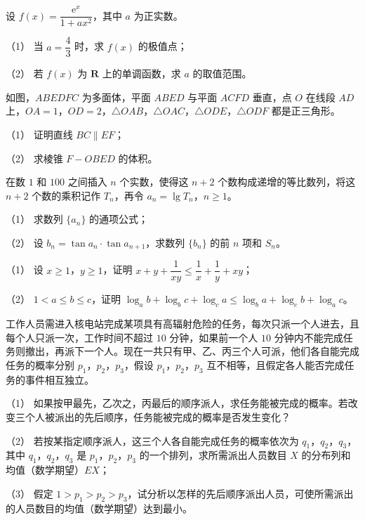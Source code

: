 \begin{question}
设 $f(x)=\dfrac{\mathrm e^x}{1+ax^2}$，其中 $a$ 为正实数。

（1） 当 $a=\dfrac43$ 时，求 $f(x)$ 的极值点；

（2） 若 $f(x)$ 为 $\mathbf R$ 上的单调函数，求 $a$ 的取值范围。

\Needspace{0.4\textheight}
\end{question}
\begin{question}
如图，$ABEDFC$ 为多面体，平面 $ABED$ 与平面 $ACFD$ 垂直，点 $O$ 在线段 $AD$ 上，$OA=1$，$OD=2$，$\triangle OAB$，$\triangle OAC$，$\triangle ODE$，$\triangle ODF$ 都是正三角形。

（1） 证明直线 $BC\parallel EF$；

（2） 求棱锥 $F-OBED$ 的体积。
\nopagebreak[4]
\begin{center}\end{center}
\nopagebreak[4]
\end{question}
\begin{question}
在数 $1$ 和 $100$ 之间插入 $n$ 个实数，使得这 $n+2$ 个数构成递增的等比数列，将这 $n+2$ 个数的乘积记作 $T_n$，再令 $a_n=\lg T_n$，$n\geqslant 1$。

（1） 求数列 $\{a_n\}$ 的通项公式；

（2） 设 $b_n=\tan a_n\cdot\tan a_{n+1}$，求数列 $\{b_n\}$ 的前 $n$ 项和 $S_n$。

\end{question}
\begin{question}

（1） 设 $x\geqslant 1$，$y\geqslant 1$，证明 $x+y+\dfrac{1}{xy}\leqslant\dfrac1x+\dfrac1y+xy$；

（2） $1<a\leqslant b\leqslant c$，证明 $\log_a b+\log_b c+\log_c a\leqslant\log_b a+\log_c b+\log_a c$。

\end{question}
\begin{question}
工作人员需进入核电站完成某项具有高辐射危险的任务，每次只派一个人进去，且每个人只派一次，工作时间不超过 $10$ 分钟，如果前一个人 $10$ 分钟内不能完成任务则撤出，再派下一个人。现在一共只有甲、乙、丙三个人可派，他们各自能完成任务的概率分别 $p_1$，$p_2$，$p_3$，假设 $p_1$，$p_2$，$p_3$ 互不相等，且假定各人能否完成任务的事件相互独立。

（1） 如果按甲最先，乙次之，丙最后的顺序派人，求任务能被完成的概率。若改变三个人被派出的先后顺序，任务能被完成的概率是否发生变化？

（2） 若按某指定顺序派人，这三个人各自能完成任务的概率依次为 $q_1$，$q_2$，$q_3$，其中 $q_1$，$q_2$，$q_3$ 是 $p_1$，$p_2$，$p_3$ 的一个排列，求所需派出人员数目 $X$ 的分布列和均值（数学期望）$EX$；

（3） 假定 $1>p_1>p_2>p_3$，试分析以怎样的先后顺序派出人员，可使所需派出的人员数目的均值（数学期望）达到最小。

\Needspace{0.4\textheight}
\end{question}
